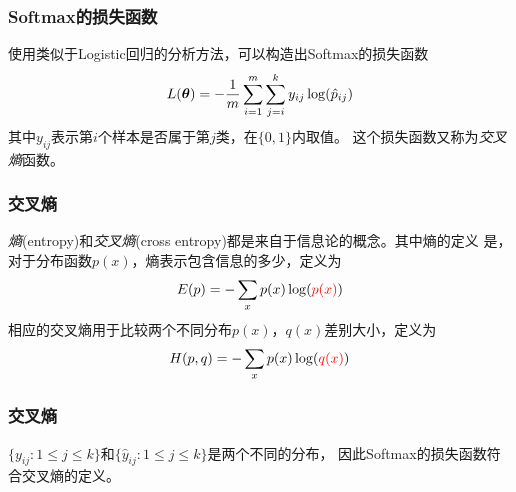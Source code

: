 \documentclass[14pt]{beamer}
\begin{document}
\begin{frame}
  \frametitle{Softmax的损失函数}
  使用类似于Logistic回归的分析方法，可以构造出Softmax的损失函数
  \begin{equation}
    L(\bm{\theta})=-\frac{1}{m}\sum_{i=1}^m\sum_{j=i}^k y_{ij}\log(\hat{p}_{ij})
  \end{equation}
  其中$y_{ij}$表示第$i$个样本是否属于第$j$类，在$\{0,1\}$内取值。
  这个损失函数又称为\emph{交叉熵}函数。
\end{frame}

\begin{frame}
  \frametitle{交叉熵}
  \emph{熵}(entropy)和\emph{交叉熵}(cross entropy)都是来自于信息论的概念。其中熵的定义
  是，对于分布函数$p(x)$，熵表示包含信息的多少，定义为
  \begin{equation}
    E(p)=-\sum_x p(x)\log({\color{red}p(x)})
  \end{equation}
  相应的交叉熵用于比较两个不同分布$p(x)$，$q(x)$差别大小，定义为
  \begin{equation}
    H(p,q)=-\sum_x p(x)\log({\color{red}q(x)})
  \end{equation}
\end{frame}

\begin{frame}
  \frametitle{交叉熵}
  $\{y_{ij}:1\leq j\leq k\}$和$\{\hat{y}_{ij}:1\leq j\leq k\}$是两个不同的分布，
  因此Softmax的损失函数符合交叉熵的定义。

  

\end{frame}
\end{document}
